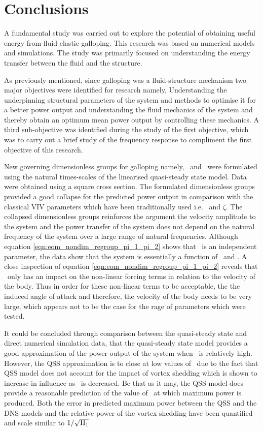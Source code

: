 \chapter{Conclusions}

A fundamental study was carried out to explore the potential of obtaining useful energy from fluid-elastic galloping. This research was based on numerical models and simulations. The study was primarily focused on understanding the energy transfer between the fluid and the structure.  

As previously mentioned, since  galloping was a fluid-structure mechanism two major objectives were identified for research namely, Understanding the underpinning structural parameters of the system and methods to optimise it for a better power output and understanding the fluid mechanics of the system and thereby obtain an optimum mean power output by controlling these mechanics. A third sub-objective was identified during the study of the first objective, which was to carry out a brief study of the frequency response to compliment the first objective of this research.  

New governing dimensionless groups for galloping namely, \massstiff\ and \massdamp\ were formulated using the natural times-scales of the linearised quasi-steady state model. Data were obtained using a square cross section. The formulated dimensionless groups provided a good collapse for the predicted power output in comparison with the classical VIV parameters which have been traditionally used i.e. \ustar\ and $\zeta$. The collapsed dimensionless groups reinforces the argument the velocity amplitude to the system and the power transfer of the system does not depend on the natural frequency of the system over a large range of natural frequencies. Although equation \ref{eqn:eom_nondim_regroup_pi_1_pi_2} shows that \mstar\ is an independent parameter, the data show that the system is essentially a function of \massstiff\ and \massdamp. A close inspection of equation \ref{eqn:eom_nondim_regroup_pi_1_pi_2} reveals that \mstar\ only has an impact on the non-linear forcing terms in relation to the velocity of the body. Thus in order for these non-linear terms to be acceptable, the the induced angle of attack and therefore, the velocity of the body needs to be very large, which appears not to be the case for the rage of parameters which were tested. 

 It could be concluded through comparison between the quasi-steady state and direct numerical simulation data, that the quasi-steady state model provides a good approximation of the power output of the system when \massstiff\ is relatively high. However, the QSS approximation is to close at low values of \massstiff\ due to the fact that QSS model does not account for the impact of vortex shedding which is shown to increase in influence as \massstiff\ is decreased. Be that as it may, the QSS model does provide a reasonable prediction of the value of \massdamp\ at which maximum power is produced. Both the error in predicted maximum power between the QSS and the DNS models and the relative power of the vortex shedding have been quantified and scale similar to $1/\sqrt{\Pi_1}$  
 
